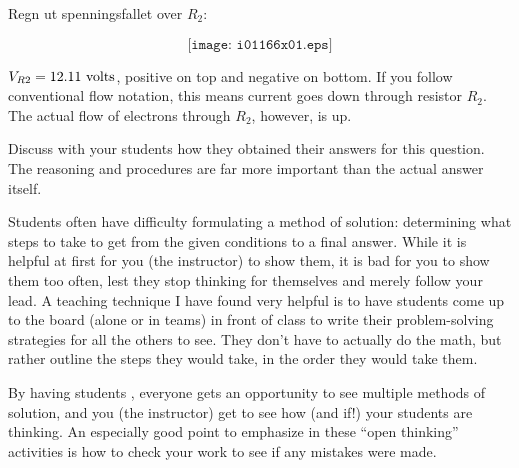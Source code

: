 

Regn ut spenningsfallet over $R_2$:

$$\texttt{[image: i01166x01.eps]}$$








$V_{R2} = 12.11 \hbox{ volts}$, positive on top and negative on bottom.  If you follow conventional flow notation, this means current goes down through resistor $R_2$.  The actual flow of electrons through $R_2$, however, is up.







Discuss with your students how they obtained their answers for this question.  The reasoning and procedures are far more important than the actual answer itself.

\vskip 10pt

Students often have difficulty formulating a method of solution: determining what steps to take to get from the given conditions to a final answer.  While it is helpful at first for you (the instructor) to show them, it is bad for you to show them too often, lest they stop thinking for themselves and merely follow your lead.  A teaching technique I have found very helpful is to have students come up to the board (alone or in teams) in front of class to write their problem-solving strategies for all the others to see.  They don't have to actually do the math, but rather outline the steps they would take, in the order they would take them.

By having students , everyone gets an opportunity to see multiple methods of solution, and you (the instructor) get to see how (and if!) your students are thinking.  An especially good point to emphasize in these ``open thinking'' activities is how to check your work to see if any mistakes were made.




